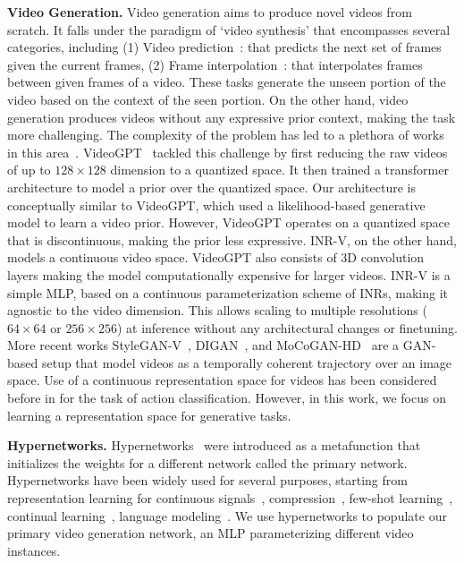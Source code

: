 \documentclass[10pt]{article} \usepackage[accepted]{tmlr}
\begin{document}
\textbf{Video Generation.} Video generation aims to produce novel videos from scratch. It falls under the paradigm of `video synthesis' that encompasses several categories, including (1) Video prediction~\cite{transformersynth, ccvs, vqvaevideopred}: that predicts the next set of frames given the current frames, (2) Frame interpolation~\cite{videointerpolationassymetric, videointerpolationsoftmaxsplatting, videointerpolationadaptiveseperableconvolution,
videointerpolationwithouttemporalpriors}: that interpolates frames between given frames of a video. These tasks generate the unseen portion of the video based on the context of the seen portion. 
On the other hand, video generation produces videos without any expressive prior context, making the task more challenging. The complexity of the problem has led to a plethora of works in this area~\cite{mocogan-hd, mocogan, stylegan-v, dvd-gan, tgan, digan}. VideoGPT~\cite{videogpt} tackled this challenge by first reducing the raw videos of up to $128 \times 128$ dimension to a quantized space. It then trained a transformer architecture to model a prior over the quantized space. Our architecture is conceptually similar to VideoGPT, which used a likelihood-based generative model to learn a video prior. However, VideoGPT operates on a quantized space that is discontinuous, making the prior less expressive. INR-V, on the other hand, models a continuous video space. VideoGPT also consists of $3$D convolution layers making the model computationally expensive for larger videos. INR-V is a simple MLP, based on a continuous parameterization scheme of INRs, making it agnostic to the video dimension. This allows scaling to multiple resolutions ($64 \times 64$ or $256 \times 256$) at inference without any architectural changes or finetuning. 
More recent works StyleGAN-V~\cite{stylegan-v}, DIGAN~\cite{digan}, and MoCoGAN-HD~\cite{mocogan-hd} are a GAN-based setup that model videos as a temporally coherent trajectory over an image space. 
Use of a continuous representation space for videos has been considered before in \cite{continuous_action_classification, continuous_action_classification_1} for the task of action classification. However, in this work, we focus on learning a representation space for generative tasks.

\textbf{Hypernetworks.} Hypernetworks~\cite{hypernetwork} were introduced as a metafunction that initializes the weights for a different network called the primary network. Hypernetworks have been widely used for several purposes, starting from representation learning for continuous signals~\cite{deepsdf, lfns, metasdf, siren, occunet, 3dhypernet2}, compression~\cite{hncompress1, hncompress2}, few-shot learning~\cite{hnfewshot1, hnfewshot2}, continual learning~\cite{continualhypernet}, language modeling~\cite{hnlangmodel}.
We use hypernetworks to populate our primary video generation network, an MLP parameterizing different video instances. 
\end{document}
